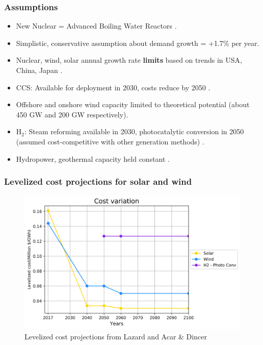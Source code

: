 \begin{frame}
  \frametitle{Assumptions}

  \begin{itemize}
  
  \item New Nuclear = Advanced Boiling Water Reactors \cite{rothwell_real_2006}.
  
  \item Simplistic, conservative assumption about demand growth = +1.7\% per year\cite{noauthor_electricity_2017}.
  
  \item Nuclear, wind, solar annual growth rate \textbf{limits} based on trends in USA, China, Japan \cite{noauthor_electricity_2017,noauthor_energy_2018,eia_international_nodate,eia_monthly_2018,iea-pvps_snapshot_2018}.
  
  \item CCS: Available for deployment in 2030, costs reduce by 2050 \cite{kato_energy_2016}.
  
  \item Offshore and onshore wind capacity limited to theoretical potential (about 450 GW and 200 GW respectively).
  
  \item H$_2$: Steam reforming available in 2030, photocatalytic conversion in 2050 (assumed cost-competitive with other generation methods) \cite{kato_energy_2016} \cite{acar_comparative_2014}.
  
  \item Hydropower, geothermal capacity held constant \cite{noauthor_energy_2018}.
  
  \end{itemize}

\end{frame}


\begin{frame}
  \frametitle{Levelized cost projections for solar and wind}
  \begin{figure}[htbp!]
    \begin{center}
      \includegraphics[scale=0.5]{./images/cost}
    \end{center}
          \caption{Levelized cost projections from Lazard \cite{noauthor_lazards_2017} and Acar \& Dincer \cite{acar_comparative_2014}}
    \label{cost}
  \end{figure}
\end{frame}

